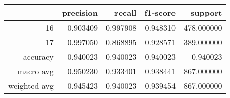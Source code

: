 \begin{table}[h]
\centering
\label{table:5}
\begin{tabular}{rrrrr}
\toprule
 & precision & recall & f1-score & support \\
\midrule
16 & 0.903409 & 0.997908 & 0.948310 & 478.000000 \\
17 & 0.997050 & 0.868895 & 0.928571 & 389.000000 \\
accuracy & 0.940023 & 0.940023 & 0.940023 & 0.940023 \\
macro avg & 0.950230 & 0.933401 & 0.938441 & 867.000000 \\
weighted avg & 0.945423 & 0.940023 & 0.939454 & 867.000000 \\
\bottomrule
\end{tabular}
\end{table}
